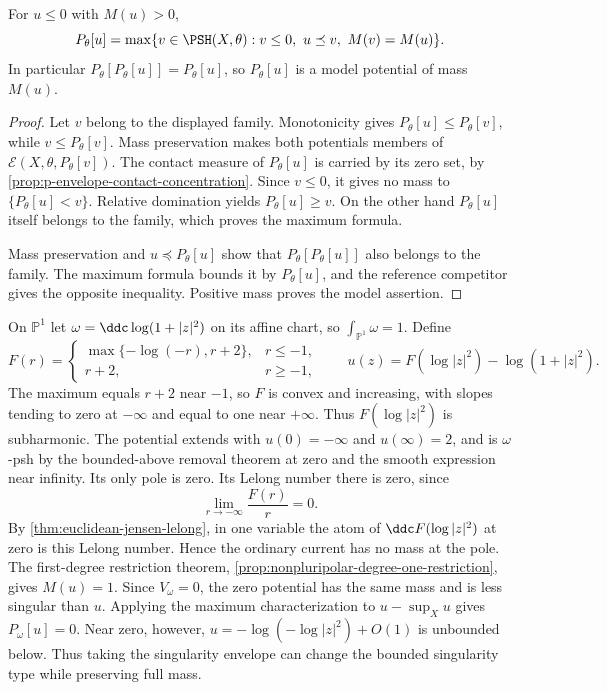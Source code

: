 \begin{theorem}\label{thm:positive-mass-model-characterization}
For $u\leq0$ with $M(u)>0$,
\[
 P_\theta[u]=\max\{v\in\PSH(X,\theta):v\leq0,
                         \ u\preceq v,\ M(v)=M(u)\}.
\]
In particular $P_\theta[P_\theta[u]]=P_\theta[u]$, so $P_\theta[u]$ is a model potential of mass $M(u)$.
\end{theorem}
\begin{proof}
Let $v$ belong to the displayed family. Monotonicity gives
$P_\theta[u]\leq P_\theta[v]$, while $v\leq P_\theta[v]$. Mass preservation makes both potentials members of
$\mathcal E(X,\theta,P_\theta[v])$. The contact measure of $P_\theta[u]$ is carried by its zero set, by \cref{prop:p-envelope-contact-concentration}. Since $v\leq0$, it gives no mass to $\{P_\theta[u]<v\}$. Relative domination yields $P_\theta[u]\geq v$. On the other hand $P_\theta[u]$ itself belongs to the family, which proves the maximum formula.

Mass preservation and $u\preceq P_\theta[u]$ show that $P_\theta[P_\theta[u]]$ also belongs to the family. The maximum formula bounds it by $P_\theta[u]$, and the reference competitor gives the opposite inequality. Positive mass proves the model assertion.
\end{proof}

\begin{example}\label{ex:loglog-full-mass-envelope}
On $\mathbb P^1$ let $\omega=\ddc\log(1+|z|^2)$ on its affine chart, so $\int_{\mathbb P^1}\omega=1$. Define
\[
 F(r)=\begin{cases}
       \max\{-\log(-r),r+2\},&r\leq-1,\\
       r+2,&r\geq-1,
      \end{cases}
 \qquad
 u(z)=F(\log|z|^2)-\log(1+|z|^2).
\]
The maximum equals $r+2$ near $-1$, so $F$ is convex and increasing, with slopes tending to zero at $-\infty$ and equal to one near $+\infty$. Thus $F(\log|z|^2)$ is subharmonic. The potential extends with $u(0)=-\infty$ and $u(\infty)=2$, and is $\omega$-psh by the bounded-above removal theorem at zero and the smooth expression near infinity. Its only pole is zero. Its Lelong number there is zero, since
\[
 \lim_{r\to-\infty}\frac{F(r)}r=0.
\]
By \cref{thm:euclidean-jensen-lelong}, in one variable the atom of $\ddc F(\log|z|^2)$ at zero is this Lelong number. Hence the ordinary current has no mass at the pole. The first-degree restriction theorem, \cref{prop:nonpluripolar-degree-one-restriction}, gives $M(u)=1$. Since $V_\omega=0$, the zero potential has the same mass and is less singular than $u$. Applying the maximum characterization to $u-\sup_Xu$ gives $P_\omega[u]=0$. Near zero, however, $u=-\log(-\log|z|^2)+O(1)$ is unbounded below. Thus taking the singularity envelope can change the bounded singularity type while preserving full mass.
\end{example}

